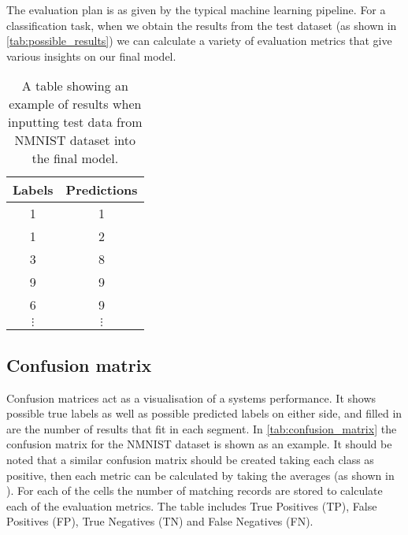 The evaluation plan is as given by the typical machine learning pipeline\cite{IntroToML}. For a classification task, when we obtain the results from the test dataset (as shown in \autoref{tab:possible_results}) we can calculate a variety of evaluation metrics that give various insights on our final model.

\begin{table}[htb]
    \centering
    \begin{tabular}{|| c  | c ||}
        \hline
        Labels     & Predictions \\
        \hline \hline
        1          & 1           \\
        \hline
        1          & 2           \\
        \hline
        3          & 8           \\
        \hline
        9          & 9           \\
        \hline
        6          & 9           \\
        \hline
        $ \vdots $ & $ \vdots $  \\
    \end{tabular}
    \caption{A table showing an example of results when inputting test data from NMNIST dataset\cite{NMNIST} into the final model.}
    \label{tab:possible_results}
\end{table}

\subsection{Confusion matrix}

Confusion matrices act as a visualisation of a systems performance. It shows possible true labels as well as possible predicted labels on either side, and filled in are the number of results that fit in each segment. In \autoref{tab:confusion_matrix} the confusion matrix for the NMNIST dataset is shown as an example. It should be noted that a similar confusion matrix should be created taking each class as positive, then each metric can be calculated by taking the averages (as shown in ). For each of the cells the number of matching records are stored to calculate each of the evaluation metrics. The table includes True Positives (TP), False Positives (FP), True Negatives (TN) and False Negatives (FN).

